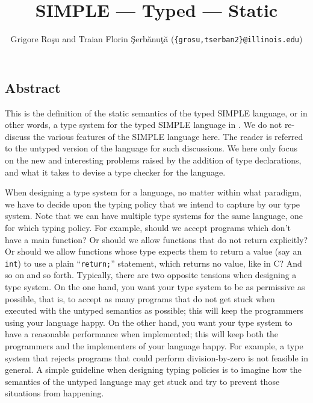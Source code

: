 \setlength{\parindent}{1em}
\title{SIMPLE --- Typed --- Static}
\author{Grigore Ro\c{s}u and 
        Traian Florin \c{S}erb\u{a}nu\c{t}\u{a}
        (\texttt{\{grosu,tserban2\}@illinois.edu})}

\maketitle

\begin{latexComment}
\section{Abstract}
This is the \K definition of the static semantics of the typed SIMPLE language,
or in other words, a type system for the typed SIMPLE language in \K.
We do not re-discuss the various features of the SIMPLE language here.
The reader is referred to the untyped version of the language for such
discussions.  We here only focus on the new and interesting problems
raised by the addition of type declarations, and what it takes to devise
a type checker for the language.

When designing a type system for a language, no matter within what paradigm,
we have to decide upon the typing policy that we intend to capture by our
type system.  Note that we can have multiple type systems
for the same language, one for which typing policy.  For example, should we
accept programs which don't have a main function?  Or should we allow functions
that do not return explicitly?  Or should we allow functions whose type expects
them to return a value (say an \texttt{int}) to use a plain ``\texttt{return;}''
statement, which returns no value, like in C?  And so on and so forth.
Typically, there are two opposite tensions when designing a type system.
On the one hand, you want your type system to be as permissive as possible,
that is, to accept as many programs that do not get stuck when executed with
the untyped semantics as possible; this will keep the programmers using
your language happy.  On  the other hand, you want your type system to have a
reasonable performance when implemented; this will keep both the programmers and
the implementers of your language happy.  For example, a type system that
rejects programs that could perform division-by-zero is not feasible in general.
A simple guideline when designing typing policies is to imagine how the
semantics of the untyped language may get stuck and try to prevent those
situations from happening.


\end{latexComment}
